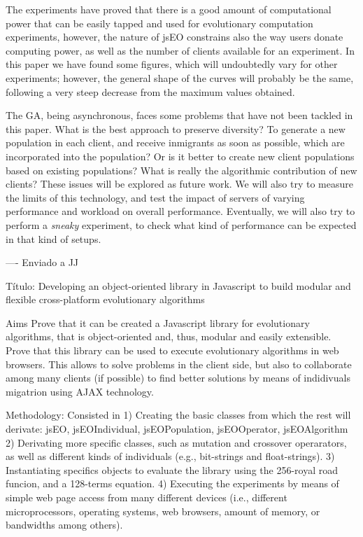 \documentclass{llncs}
\begin{document}
The experiments have proved that there is a good amount of
computational power that can be easily tapped and used for
evolutionary computation experiments, however, the nature of jsEO
constrains also the way users donate computing power, as well as the
number of clients available for an experiment. In this paper we have
found some figures, which will undoubtedly vary for other experiments;
however, the general shape of the curves will probably be the same,
following a very steep decrease from the maximum values obtained. 

The GA, being asynchronous, faces some problems that have not been
tackled in this paper. What is the best approach to preserve
diversity? To generate a new population in each client, and receive
inmigrants as soon as possible, which are incorporated into the
population? Or is it better to create new client populations based on
existing populations? What is really the algorithmic contribution of
new clients? These issues will be explored as future work. 
We will also try to measure the limits of this technology, and test
the impact of servers of varying performance and workload on overall
performance. Eventually, we will also try to perform a {\em sneaky}
experiment, to check what kind of performance can be expected in that
kind of setups. 



----
Enviado a JJ

Título:
Developing an object-oriented library in Javascript to build modular and flexible cross-platform evolutionary algorithms 

Aims
Prove that it can be created a Javascript library for evolutionary algorithms, that is object-oriented and, thus, modular and easily extensible.
Prove that this library can be used to execute evolutionary algorithms in web browsers. This allows to solve problems in the client side, but also to collaborate among many clients (if possible) to find better solutions by means of indidivuals migatrion using AJAX technology.

Methodology:
Consisted in
1) Creating the basic classes from which the rest will derivate: jsEO, jsEOIndividual, jsEOPopulation, jsEOOperator, jsEOAlgorithm
2) Derivating more specific classes, such as mutation and crossover operarators, as well as different kinds of individuals (e.g., bit-strings and float-strings).
3) Instantiating specifics objects to evaluate the library using the 256-royal road funcion, and a 128-terms equation.
4) Executing the experiments by means of simple web page access from many different devices (i.e., different microprocessors, operating systems, web browsers, amount of memory, or bandwidths among others).
\end{document}
